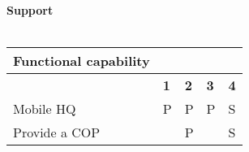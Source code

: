 \vspace{30pt}
\noindent \textbf{Support}\\\\
\def\arraystretch{1.5}
\noindent\begin{tabular}{|>{}p{4.8cm}|>{\centering\arraybackslash}p{1.5cm}|>{\centering\arraybackslash}p{1.5cm}|>{\centering\arraybackslash}p{1.5cm}|>{\centering\arraybackslash}p{1.5cm}|}
	\hline \textbf{Functional capability} &  \multicolumn{4}{c}{\textbf{Missions}} \vline \\ 
	\hline  							& \textbf{1} & \textbf{2} & \textbf{3} & \textbf{4} \\ 
	\hline Mobile HQ 					& P & P & P & S \\ 
	\hline Provide a COP 				&  & P &  & S \\
	\hline 
\end{tabular}











